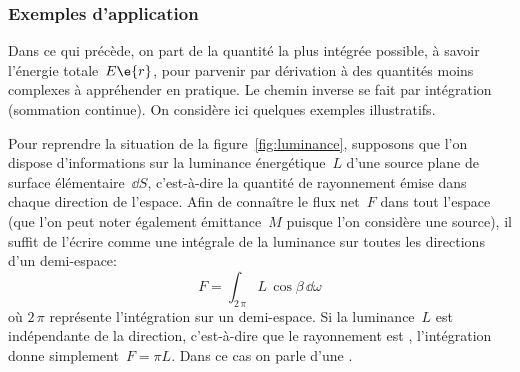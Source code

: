 \sk
\subsubsection{Exemples d'application}

\sk
Dans ce qui précède, on part de la quantité la plus intégrée possible, à savoir l'énergie totale~$E\e{r}$, pour parvenir par dérivation à des quantités moins complexes à appréhender en pratique. Le chemin inverse se fait par intégration (sommation continue). On considère ici quelques exemples illustratifs. 
\begin{finger}
\item Pour reprendre la situation de la figure~\ref{fig:luminance}, supposons que l'on dispose d'informations sur la luminance énergétique~$L$ d'une source plane de surface élémentaire~$\dd S$, c'est-à-dire la quantité de rayonnement émise dans chaque direction de l'espace. Afin de connaître le flux net~$F$ dans tout l'espace (que l'on peut noter également émittance~$M$ puisque l'on considère une source), il suffit de l'écrire comme une intégrale de la luminance sur toutes les directions d'un demi-espace: $$ F = \int_{2\,\pi} L \, \cos\beta \, \dd \omega $$ où $2\,\pi$ représente l'intégration sur un demi-espace. %
Si la luminance~$L$ est indépendante de la direction, c'est-à-dire que le rayonnement est , l'intégration donne simplement~$F=\pi L$. Dans ce cas on parle d'une .

\end{finger}
